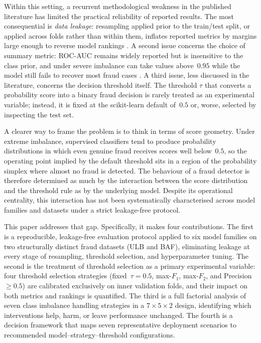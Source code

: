 \documentclass[a4paper,fleqn]{cas-sc}
\begin{document}
Within this setting, a recurrent methodological weakness in the published literature
has limited the practical reliability of reported results. The most consequential is
\emph{data leakage}: resampling applied prior to the train/test split, or applied across
folds rather than within them, inflates reported metrics by margins large enough to
reverse model rankings \citep{hayat2025leakage}. A second issue concerns the choice of
summary metric: ROC-AUC remains widely reported but is insensitive to the class prior,
and under severe imbalance can take values above~$0.95$ while the model still fails to
recover most fraud cases \citep{saito2015precision}. A third issue, less discussed in
the literature, concerns the decision threshold itself. The threshold $\tau$ that
converts a probability score into a binary fraud decision is rarely treated as an
experimental variable; instead, it is fixed at the scikit-learn default of~$0.5$ or,
worse, selected by inspecting the test set.

A clearer way to frame the problem is to think in terms of score geometry. Under extreme
imbalance, supervised classifiers tend to produce probability distributions in which
even genuine fraud receives scores well below~$0.5$, so the operating point implied by
the default threshold sits in a region of the probability simplex where almost no
fraud is detected. The behaviour of a fraud detector is therefore determined as much
by the interaction between the score distribution and the threshold rule as by the
underlying model. Despite its operational centrality, this interaction has not been
systematically characterised across model families and datasets under a strict
leakage-free protocol.

This paper addresses that gap. Specifically, it makes four contributions. The first is
a reproducible, leakage-free evaluation protocol applied to six model families on two
structurally distinct fraud datasets (ULB and BAF), eliminating leakage at every stage
of resampling, threshold selection, and hyperparameter tuning. The second is the
treatment of threshold selection as a primary experimental variable: four threshold
selection strategies (fixed~$\tau=0.5$, max-$F_1$, max-$F_2$, and Precision~$\geq 0.5$)
are calibrated exclusively on inner validation folds, and their impact on both metrics
and rankings is quantified. The third is a full factorial analysis of seven class
imbalance handling strategies in a $7{\times}5{\times}2$ design, identifying which
interventions help, harm, or leave performance unchanged. The fourth is a decision
framework that maps seven representative deployment scenarios to recommended
model--strategy--threshold configurations.
\end{document}

